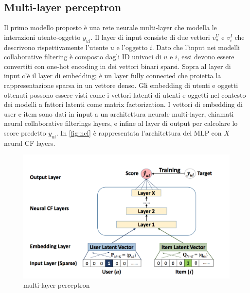 \documentclass[12pt,italian]{report}
\begin{document}
\subsection{Multi-layer perceptron}
Il primo modello proposto è una rete neurale multi-layer che modella le interazioni utente-oggetto $y_{ui}$. Il layer di input consiste di due vettori $v_u^U$ e $v_i^I$ che descrivono rispettivamente l'utente $u$ e l'oggetto $i$. Dato che l'input nei modelli collaborative filtering è composto dagli ID univoci di $u$ e $i$, essi devono essere convertiti con one-hot encoding in dei vettori binari sparsi.
Sopra al layer di input c'è il layer di embedding; è un layer fully connected che proietta la rappresentazione sparsa in un vettore denso.
Gli embedding di utenti e oggetti ottenuti possono essere visti come i vettori latenti di utenti e oggetti nel contesto dei modelli a fattori latenti come matrix factorization.
I vettori di embedding di user e item sono dati in input a un architettura neurale multi-layer, chiamati neural collaborative filterings layers, e infine al layer di output per calcolare lo score predetto $y_{ui}$. In \autoref{fig:ncf} è rappresentata l'architettura del MLP con $X$ neural CF layers.

\begin{figure}
  \includegraphics[width=\linewidth]{immagini/ncf.png}
  \caption{multi-layer perceptron}
  \label{fig:ncf}
\end{figure}
\end{document}
